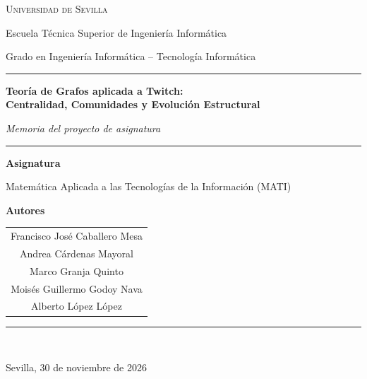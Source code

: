 \documentclass[11pt,a4paper]{article}
\begin{document}
\begin{titlepage}
    \centering
    \vspace*{1cm}

    {\large \textsc{Universidad de Sevilla} \par}
    \vspace{0.2cm}
    {\normalsize Escuela Técnica Superior de Ingeniería Informática \par}
    {\normalsize Grado en Ingeniería Informática -- Tecnología Informática \par}

    \vspace{1.2cm}
    {\color{burdeosUS}\rule{\linewidth}{2.2pt}}
    \vspace{0.8cm}

    {\LARGE \bfseries \color{burdeosUS}
    Teoría de Grafos aplicada a Twitch:\\[0.3em]
    Centralidad, Comunidades y Evolución Estructural \par}

    \vspace{0.5cm}
    {\large \itshape Memoria del proyecto de asignatura \par}

    \vspace{0.8cm}
    {\color{alberoUS}\rule{0.6\linewidth}{2pt}}

    \vspace{2.2cm}

    {\large \textbf{Asignatura} \par}
    \vspace{0.2cm}
    {Matemática Aplicada a las Tecnologías de la Información (MATI) \par}

    \vspace{1.6cm}

    {\large \textbf{Autores} \par}
    \vspace{0.4cm}
    \begin{tabular}{c}
        Francisco José Caballero Mesa \\[0.25em]
        Andrea Cárdenas Mayoral \\[0.25em]
        Marco Granja Quinto \\[0.25em]
        Moisés Guillermo Godoy Nava \\[0.25em]
        Alberto López López
    \end{tabular}

    \vfill

    {\color{burdeosUS}\rule{0.4\linewidth}{0.8pt}}\\[0.5em]
    {\large Sevilla, 30 de noviembre de 2026 \par}
\end{titlepage}
\end{document}
